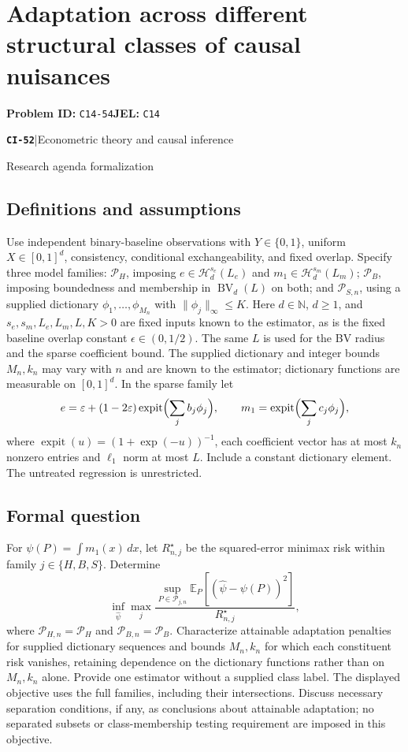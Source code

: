 \documentclass[11pt,a4paper]{article}
\newcommand{\E}{\mathbb E}
\newcommand{\N}{\mathbb N}
\newcommand{\entrymeta}[3]{{\sffamily\small\color{muted}\textbf{\texttt{#1}}\quad|\quad #2\par #3\par}}
\begin{document}
\section*{Adaptation across different structural classes of causal nuisances}
\textbf{Problem ID:} \texttt{C14-54}\quad \textbf{JEL:} \texttt{C14}\par
\label{problem:OP-0531}
\label{beyond:CI-52}
\entrymeta{CI-52}{Econometric theory and causal inference}{Research agenda formalization}
\subsection*{Definitions and assumptions}
Use independent binary-baseline observations with $Y\in\{0,1\}$, uniform $X\in[0,1]^d$, consistency, conditional exchangeability, and fixed overlap. Specify three model families: $\mathcal P_H$, imposing $e\in\mathcal H_d^{s_e}(L_e)$ and $m_1\in\mathcal H_d^{s_m}(L_m)$; $\mathcal P_B$, imposing boundedness and membership in $\operatorname{BV}_d(L)$ on both; and $\mathcal P_{S,n}$, using a supplied dictionary $\phi_1,\ldots,\phi_{M_n}$ with $\|\phi_j\|_\infty\leq K$. Here $d\in\N$, $d\geq1$, and $s_e,s_m,L_e,L_m,L,K>0$ are fixed inputs known to the estimator, as is the fixed baseline overlap constant $\epsilon\in(0,1/2)$. The same $L$ is used for the BV radius and the sparse coefficient bound. The supplied dictionary and integer bounds $M_n,k_n$ may vary with $n$ and are known to the estimator; dictionary functions are measurable on $[0,1]^d$. In the sparse family let
\[
 e=\varepsilon+(1-2\varepsilon)\operatorname{expit}
       \Bigl(\sum_jb_j\phi_j\Bigr),\qquad
 m_1=\operatorname{expit}\Bigl(\sum_jc_j\phi_j\Bigr),
\]
where $\operatorname{expit}(u)=(1+\exp(-u))^{-1}$, each coefficient vector has at most $k_n$ nonzero entries and $\ell_1$ norm at most $L$. Include a constant dictionary element. The untreated regression is unrestricted.
\subsection*{Formal question}
For $\psi(P)=\int m_1(x)\,dx$, let $R_{n,j}^\star$ be the squared-error minimax risk within family $j\in\{H,B,S\}$. Determine
\[
 \inf_{\widehat\psi}\max_j
 \frac{\sup_{P\in\mathcal P_{j,n}}
       \E_P[(\widehat\psi-\psi(P))^2]}{R_{n,j}^\star},
\]
where $\mathcal P_{H,n}=\mathcal P_H$ and $\mathcal P_{B,n}=\mathcal P_B$. Characterize attainable adaptation penalties for supplied dictionary sequences and bounds $M_n,k_n$ for which each constituent risk vanishes, retaining dependence on the dictionary functions rather than on $M_n,k_n$ alone. Provide one estimator without a supplied class label. The displayed objective uses the full families, including their intersections. Discuss necessary separation conditions, if any, as conclusions about attainable adaptation; no separated subsets or class-membership testing requirement are imposed in this objective.
\end{document}
